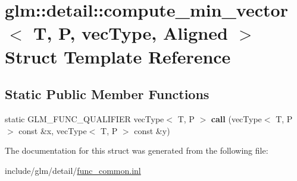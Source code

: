 \hypertarget{structglm_1_1detail_1_1compute__min__vector}{}\section{glm\+:\+:detail\+:\+:compute\+\_\+min\+\_\+vector$<$ T, P, vec\+Type, Aligned $>$ Struct Template Reference}
\label{structglm_1_1detail_1_1compute__min__vector}
\subsection*{Static Public Member Functions}
\begin{DoxyCompactItemize}
\item 
\mbox{\label{structglm_1_1detail_1_1compute__min__vector_adf7bbbad7f135247d5d573140c437881}} 
static G\+L\+M\+\_\+\+F\+U\+N\+C\+\_\+\+Q\+U\+A\+L\+I\+F\+I\+ER vec\+Type$<$ T, P $>$ {\bfseries call} (vec\+Type$<$ T, P $>$ const \&x, vec\+Type$<$ T, P $>$ const \&y)
\end{DoxyCompactItemize}


The documentation for this struct was generated from the following file\+:\begin{DoxyCompactItemize}
\item 
include/glm/detail/\hyperlink{func__common_8inl}{func\+\_\+common.\+inl}\end{DoxyCompactItemize}
